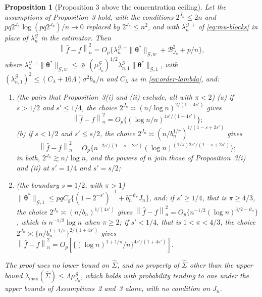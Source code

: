 \documentclass[10pt]{book}
\newtheorem{proposition}{Proposition}[section]
\theoremstyle{definition}
\newcommand{\normn}[1]{\left\lVert #1 \right\rVert_{n}}
\newcommand{\btheta}{\boldsymbol{\theta}}
\newcommand{\thetastar}{\btheta^{*}}
\newcommand{\Gramhat}{\widehat{\Sigma}}
\newcommand{\pen}{\lambda}
\newcommand{\seff}{s'}
\newcommand{\lmaxx}{\lambda_{\max}}
\newcommand{\Gcal}{\mathcal{G}}
\newcommand{\bn}{b_{n}}
\newcommand{\nGw}[1]{\lVert #1\rVert_{\mathcal{G},w}}
\newcommand{\nGone}[1]{\lVert #1\rVert_{\mathcal{G},1}}
\newcommand{\lamG}{\lambda^{\mathcal{G}}_{n}}
\newcommand{\lamGone}{\lambda^{\mathcal{G}}_{n,1}}
\newcommand{\lamGp}{\lambda^{\mathcal{G},+}_{n}}   %
\begin{document}
{\begin{proposition}[Proposition 3 above the concentration ceiling]
\label{prop:slow-ceiling}
Let the assumptions of Proposition~3 hold, with the conditions $2^{J_n} \le 2n$
and $pq2^{J_n}\log(pq2^{J_n})/n \to 0$ replaced by $2^{J_n} \le n^{2}$, and
with $\lamGp$ of \eqref{eq:mu-blocks} in place of $\lamG$ in the estimator.
Then
\[
  \normn{\widehat{f}-f}^{2} = O_p\bigl\{\lamGp\nGw{\thetastar} +
  \mathcal{B}_{J_n}^{2} + p/n\bigr\},
\]
where $\lamGp\nGw{\thetastar} \le \bar\varrho\,(\mu^{\Gcal}_{J_n})^{1/2}
\lamGone\nGone{\thetastar}$,
with $(\lamGone)^{2} \le (C_{\pen} + 16\Lambda)\sigma^{2}\bn/n$ and $C_{\pen}$
as in \eqref{eq:order-lambda}, and:
\begin{enumerate}
\item[(iii)] (the pairs that Proposition~3(i) and (ii) exclude, all with
$\pi < 2$) (a) if $s > 1/2$ and $\seff \le 1/4$, the choice
$2^{J_n} \asymp (n/\log n)^{2/(1+4\seff)}$ gives
\[
  \normn{\widehat{f}-f}^{2} = O_p\bigl\{(\log n/n)^{4\seff/(1+4\seff)}\bigr\};
\]
(b) if $s < 1/2$ and $\seff \le s/2$, the choice
$2^{J_n} \asymp (n/\bn^{1/\pi})^{1/(1-s+2\seff)}$ gives
\[
  \normn{\widehat{f}-f}^{2}
  = O_p\bigl\{n^{-2\seff/(1-s+2\seff)}
  (\log n)^{(1/\pi)2\seff/(1-s+2\seff)}\bigr\};
\]
in both, $2^{J_n} \gtrsim n/\log n$, and the powers of $n$ join those of
Proposition~3(i) and (ii) at $\seff = 1/4$ and $\seff = s/2$;
\item[(iv)] (the boundary $s = 1/2$, with $\pi > 1$)
$\nGone{\thetastar} \le pqC_g\{(1-2^{-\seff})^{-1} + \bn^{-\vartheta_{\pi}}J_n\}$,
and: if $\seff \ge 1/4$, that is $\pi \ge 4/3$, the choice
$2^{J_n} \asymp (n/\bn)^{1/(4\seff)}$ gives
$\normn{\widehat{f}-f}^{2} = O_p\{n^{-1/2}(\log n)^{3/2-\vartheta_{\pi}}\}$,
which is $n^{-1/2}\log n$ when $\pi \ge 2$; if $\seff < 1/4$, that is
$1 < \pi < 4/3$, the choice
$2^{J_n} \asymp \{n/\bn^{1+1/\pi}\}^{2/(1+4\seff)}$ gives
$\normn{\widehat{f}-f}^{2} =
O_p[\{(\log n)^{1+1/\pi}/n\}^{4\seff/(1+4\seff)}]$.
\end{enumerate}
The proof uses no lower bound on $\Gramhat$, and no property of $\Gramhat$
other than the upper bound $\lmaxx(\Gramhat) \le \Lambda\mu^{\Gcal}_{J_n}$, which
holds with probability tending to one under the upper bounds of Assumptions~2
and~3 alone, with no condition on $J_n$.
\end{proposition}

}
\end{document}
